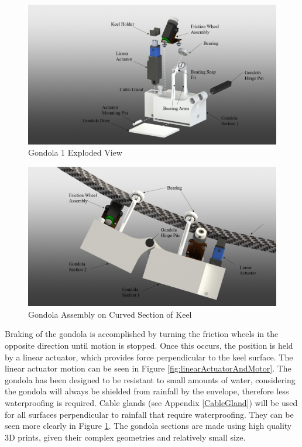 \documentclass[../main.tex]{subfiles}
\begin{document}
\begin{figure}[H]
	\centering
	\includegraphics[width=.8\linewidth]{img/design/gondola/gondola1ExplodedView.png}
	\caption{Gondola 1 Exploded View}
	\label{fig:gondola1ExplodedView}
\end{figure}

\begin{figure}[H]
	\centering
	\includegraphics[width=.8\linewidth]{img/design/gondola/gondolaBent.png}
	\caption{Gondola Assembly on Curved Section of Keel}
	\label{fig:gondolaBent}
\end{figure}

Braking of the gondola is accomplished by turning the friction wheels in the opposite direction until motion is stopped. Once this occurs, the position is held by a linear actuator, which provides force perpendicular to the keel surface. The linear actuator motion can be seen in Figure \ref{fig:linearActuatorAndMotor}. The gondola has been designed to be resistant to small amounts of water, considering the gondola will always be shielded from rainfall by the envelope, therefore less waterproofing is required. Cable glands (see Appendix \ref{CableGland}) will be used for all surfaces perpendicular to rainfall that require waterproofing. They can be seen more clearly in Figure \ref{fig:gondola1ExplodedView}. The gondola sections are made using high quality 3D prints, given their complex geometries and relatively small size.
\\
\end{document}
